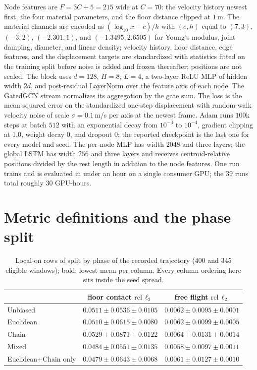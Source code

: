 \documentclass[mlabstract,onecolumn]{jmlr}
\newcommand{\rel}{\mathrm{rel}\,\ell_2}
\begin{document}
Node features are $F=3C+5=215$ wide at $C{=}70$: the velocity history newest
first, the four material parameters, and the floor distance clipped at $1$\,m.
The material channels are encoded as $(\log_{10}x-c)/h$ with $(c,h)$ equal to
$(7,3)$, $(-3,2)$, $(-2.301,1)$, and $(-1.3495,2.6505)$ for Young's modulus,
joint damping, diameter, and linear density; velocity history, floor distance,
edge features, and the displacement targets are standardized with statistics
fitted on the training split before noise is added and frozen thereafter;
positions are not scaled. The block uses $d{=}128$, $H{=}8$, $L{=}4$, a
two-layer ReLU MLP of hidden width $2d$, and post-residual LayerNorm over the
feature axis of each node. The GatedGCN stream normalizes its aggregation by
the gate sum. The loss is the mean squared error on the standardized one-step
displacement with random-walk velocity noise of scale $\sigma{=}0.1$\,m/s per
axis at the newest frame. Adam runs $100$k steps at batch $512$ with an
exponential decay from $10^{-3}$ to $10^{-4}$, gradient clipping at $1.0$,
weight decay $0$, and dropout $0$; the reported checkpoint is the last one for every model and seed. The per-node MLP has width $2048$ and three layers; the
global LSTM has width $256$ and three layers and receives centroid-relative
positions divided by the rest length in addition to the node features. One
run trains and is evaluated in under an hour on a single consumer GPU; the $39$ runs
total roughly $30$ GPU-hours.

\section{Metric definitions and the phase split}
\label{apd:metrics}

\begin{table}[ht]
\centering\footnotesize
\setlength{\tabcolsep}{6pt}
\begin{tabular}{@{}lcc@{}}
\toprule
& floor contact $\rel$ & free flight $\rel$ \\
\midrule
Unbiased & $0.0511\pm0.0536\pm0.0105$ & $0.0062\pm0.0095\pm0.0001$ \\
Euclidean & $0.0510\pm0.0615\pm0.0080$ & $0.0062\pm0.0099\pm0.0005$ \\
Chain & $0.0529\pm0.0871\pm0.0122$ & $0.0064\pm0.0131\pm0.0014$ \\
Mixed & $0.0484\pm0.0551\pm0.0135$ & $\mathbf{0.0058\pm0.0097\pm0.0011}$ \\
Euclidean+Chain only & $\mathbf{0.0479\pm0.0643\pm0.0068}$ & $0.0061\pm0.0127\pm0.0010$ \\
\bottomrule
\end{tabular}
\caption{Local-on rows of  split by phase of the
recorded trajectory ($400$ and $345$ eligible windows); bold: lowest mean per
column. Every column ordering here sits inside the seed spread.}
\label{tab:regimes}
\end{table}
\end{document}
